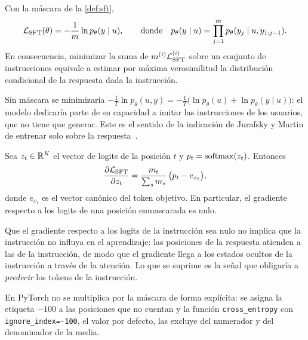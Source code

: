 \begin{proposicion}\label{prop:sft-condicional}
Con la máscara de la \cref{def:sft},
\[
\mathcal{L}_{\mathrm{SFT}}(\theta)=-\frac{1}{m}\ln p_\theta(y\mid u),\qquad\text{donde}\quad p_\theta(y\mid u)=\prod_{j=1}^{m}p_\theta(y_j\mid u,y_{1:j-1}).
\]
En consecuencia, minimizar la suma de $m^{(i)}\mathcal{L}_{\mathrm{SFT}}^{(i)}$ sobre un conjunto de instrucciones equivale a estimar por máxima verosimilitud la distribución condicional de la respuesta dada la instrucción.
\end{proposicion}

\begin{observacion}
Sin máscara se minimizaría $-\frac{1}{T}\ln p_\theta(u,y)=-\frac1T\bigl(\ln p_\theta(u)+\ln p_\theta(y\mid u)\bigr)$: el modelo dedicaría parte de su capacidad a imitar las instrucciones de los usuarios, que no tiene que generar. Este es el sentido de la indicación de Jurafsky y Martin de entrenar solo sobre la respuesta~\cite[§8.1]{jm3}.
\end{observacion}

\begin{proposicion}\label{prop:grad-mascara}
Sea $z_t\in\mathbb{R}^{K}$ el vector de logits de la posición $t$ y $p_t=\operatorname{softmax}(z_t)$. Entonces
\[
\frac{\partial\mathcal{L}_{\mathrm{SFT}}}{\partial z_t}=\frac{m_t}{\sum_{s}m_s}\,\bigl(p_t-e_{x_t}\bigr),
\]
donde $e_{x_t}$ es el vector canónico del token objetivo. En particular, el gradiente respecto a los logits de una posición enmascarada es nulo.
\end{proposicion}

\begin{observacion}
Que el gradiente respecto a los logits de la instrucción sea nulo no implica que la instrucción no influya en el aprendizaje: las posiciones de la respuesta atienden a las de la instrucción, de modo que el gradiente llega a los estados ocultos de la instrucción a través de la atención. Lo que se suprime es la señal que obligaría a \emph{predecir} los tokens de la instrucción.
\end{observacion}

\addtocounter{definicion}{1}%

\begin{observacion}[Implementación]
En PyTorch no se multiplica por la máscara de forma explícita: se asigna la etiqueta $-100$ a las posiciones que no cuentan y la función \texttt{cross\_\allowbreak entropy} con \texttt{ignore\_index=-100}, el valor por defecto, las excluye del numerador y del denominador de la media.
\end{observacion}

